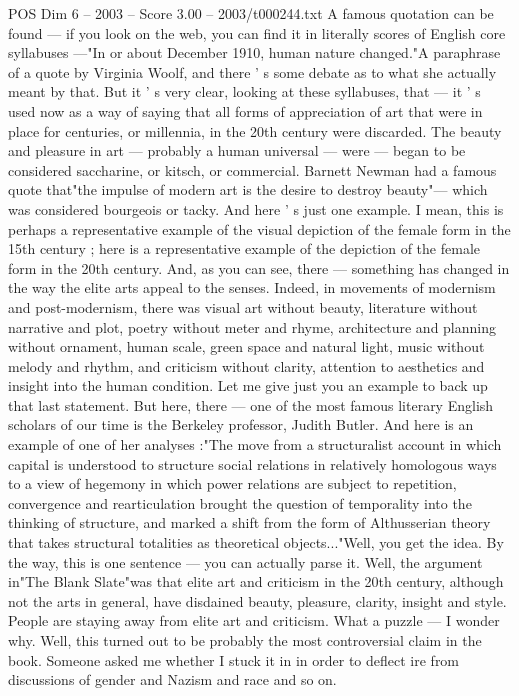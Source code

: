 \begin{textsample}{POS Dim 6 – 2003 – Score 3.00 – 2003/t000244.txt}
A famous quotation can be found — if you look on the web, you can find it in literally scores of English core syllabuses —"In or about December 1910, human nature changed."A paraphrase of a quote by Virginia Woolf, and there ' s some debate as to what she actually meant by that.
But it ' s very clear, looking at these syllabuses, that — it ' s used now as a way of saying that all forms of appreciation of art that were in place for centuries, or millennia, in the 20th century were discarded.
The beauty and pleasure in art — probably a human universal — were — began to be considered saccharine, or kitsch, or commercial.
Barnett Newman had a famous quote that"the impulse of modern art is the desire to destroy beauty"— which was considered bourgeois or tacky.
And here ' s just one example.
I mean, this is perhaps a representative example of the visual depiction of the female form in the 15th century ; here is a representative example of the depiction of the female form in the 20th century.
And, as you can see, there — something has changed in the way the elite arts appeal to the senses.
Indeed, in movements of modernism and post-modernism, there was visual art without beauty, literature without narrative and plot, poetry without meter and rhyme, architecture and planning without ornament, human scale, green space and natural light, music without melody and rhythm, and criticism without clarity, attention to aesthetics and insight into the human condition.
Let me give just you an example to back up that last statement.
But here, there — one of the most famous literary English scholars of our time is the Berkeley professor, Judith Butler.
And here is an example of one of her analyses :"The move from a structuralist account in which capital is understood to structure social relations in relatively homologous ways to a view of hegemony in which power relations are subject to repetition, convergence and rearticulation brought the question of temporality into the thinking of structure, and marked a shift from the form of Althusserian theory that takes structural totalities as theoretical objects..."Well, you get the idea.
By the way, this is one sentence — you can actually parse it.
Well, the argument in"The Blank Slate"was that elite art and criticism in the 20th century, although not the arts in general, have disdained beauty, pleasure, clarity, insight and style.
People are staying away from elite art and criticism.
What a puzzle — I wonder why.
Well, this turned out to be probably the most controversial claim in the book.
Someone asked me whether I stuck it in in order to deflect ire from discussions of gender and Nazism and race and so on.

\end{textsample}
